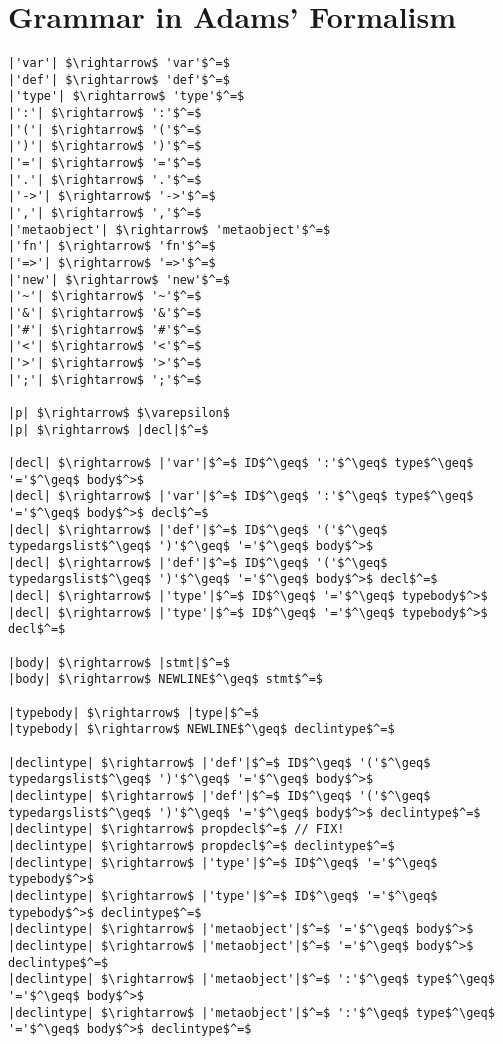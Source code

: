 \section{Grammar in Adams' Formalism}
\label{s:grammar}

\begin{lstlisting}[mathescape]
|'var'| $\rightarrow$ 'var'$^=$
|'def'| $\rightarrow$ 'def'$^=$
|'type'| $\rightarrow$ 'type'$^=$
|':'| $\rightarrow$ ':'$^=$
|'('| $\rightarrow$ '('$^=$
|')'| $\rightarrow$ ')'$^=$
|'='| $\rightarrow$ '='$^=$
|'.'| $\rightarrow$ '.'$^=$
|'->'| $\rightarrow$ '->'$^=$
|','| $\rightarrow$ ','$^=$
|'metaobject'| $\rightarrow$ 'metaobject'$^=$
|'fn'| $\rightarrow$ 'fn'$^=$
|'=>'| $\rightarrow$ '=>'$^=$
|'new'| $\rightarrow$ 'new'$^=$
|'~'| $\rightarrow$ '~'$^=$
|'&'| $\rightarrow$ '&'$^=$
|'#'| $\rightarrow$ '#'$^=$
|'<'| $\rightarrow$ '<'$^=$
|'>'| $\rightarrow$ '>'$^=$
|';'| $\rightarrow$ ';'$^=$

|p| $\rightarrow$ $\varepsilon$
|p| $\rightarrow$ |decl|$^=$

|decl| $\rightarrow$ |'var'|$^=$ ID$^\geq$ ':'$^\geq$ type$^\geq$ '='$^\geq$ body$^>$
|decl| $\rightarrow$ |'var'|$^=$ ID$^\geq$ ':'$^\geq$ type$^\geq$ '='$^\geq$ body$^>$ decl$^=$
|decl| $\rightarrow$ |'def'|$^=$ ID$^\geq$ '('$^\geq$ typedargslist$^\geq$ ')'$^\geq$ '='$^\geq$ body$^>$
|decl| $\rightarrow$ |'def'|$^=$ ID$^\geq$ '('$^\geq$ typedargslist$^\geq$ ')'$^\geq$ '='$^\geq$ body$^>$ decl$^=$
|decl| $\rightarrow$ |'type'|$^=$ ID$^\geq$ '='$^\geq$ typebody$^>$
|decl| $\rightarrow$ |'type'|$^=$ ID$^\geq$ '='$^\geq$ typebody$^>$ decl$^=$

|body| $\rightarrow$ |stmt|$^=$
|body| $\rightarrow$ NEWLINE$^\geq$ stmt$^=$

|typebody| $\rightarrow$ |type|$^=$
|typebody| $\rightarrow$ NEWLINE$^\geq$ declintype$^=$

|declintype| $\rightarrow$ |'def'|$^=$ ID$^\geq$ '('$^\geq$ typedargslist$^\geq$ ')'$^\geq$ '='$^\geq$ body$^>$
|declintype| $\rightarrow$ |'def'|$^=$ ID$^\geq$ '('$^\geq$ typedargslist$^\geq$ ')'$^\geq$ '='$^\geq$ body$^>$ declintype$^=$
|declintype| $\rightarrow$ propdecl$^=$ // FIX!
|declintype| $\rightarrow$ propdecl$^=$ declintype$^=$
|declintype| $\rightarrow$ |'type'|$^=$ ID$^\geq$ '='$^\geq$ typebody$^>$
|declintype| $\rightarrow$ |'type'|$^=$ ID$^\geq$ '='$^\geq$ typebody$^>$ declintype$^=$
|declintype| $\rightarrow$ |'metaobject'|$^=$ '='$^\geq$ body$^>$
|declintype| $\rightarrow$ |'metaobject'|$^=$ '='$^\geq$ body$^>$ declintype$^=$
|declintype| $\rightarrow$ |'metaobject'|$^=$ ':'$^\geq$ type$^\geq$ '='$^\geq$ body$^>$
|declintype| $\rightarrow$ |'metaobject'|$^=$ ':'$^\geq$ type$^\geq$ '='$^\geq$ body$^>$ declintype$^=$


\end{lstlisting}

